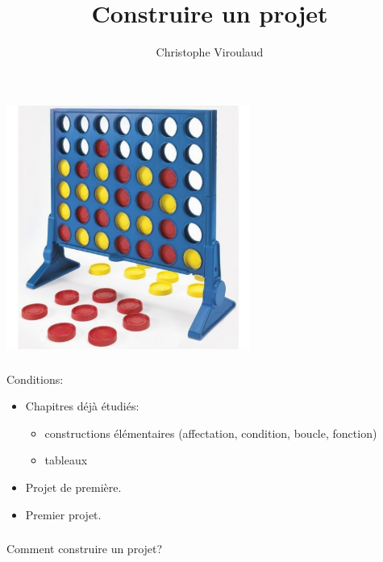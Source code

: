 \documentclass[svgnames,11pt]{beamer}
\author[]{Christophe Viroulaud}
\title{Construire un projet}
\date{\framebox{\textbf{NSI}}}
\institute{Formation NSI}
\begin{document}
\begin{frame}
    \titlepage
\end{frame}
\begin{frame}
    \frametitle{}

    \begin{center}
        \centering
        \includegraphics[width=8cm]{ressources/puissance4.jpg}
        \label{IMG}
    \end{center}

\end{frame}
\begin{frame}
    \frametitle{}

    Conditions:
    \begin{itemize}
        \item Chapitres déjà étudiés:
              \begin{itemize}
                  \item constructions élémentaires (affectation, condition, boucle, fonction)
                  \item tableaux
              \end{itemize}
        \item Projet de première.
        \item Premier projet.
    \end{itemize}

\end{frame}
\begin{frame}
    \frametitle{}

    \begin{framed}
        \centering Comment construire un projet?
    \end{framed}

\end{frame}
\end{document}
